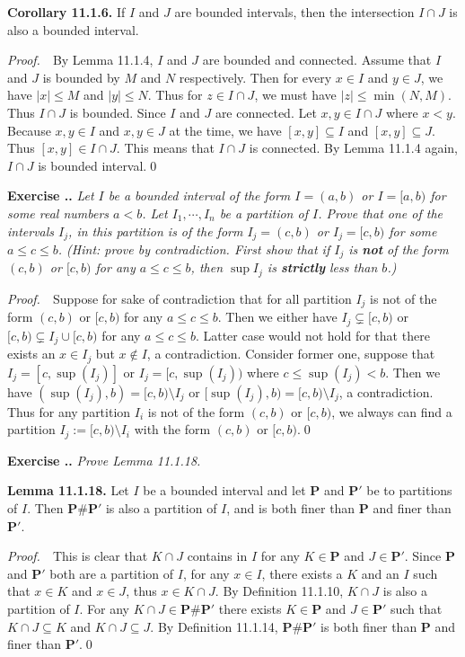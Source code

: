 \documentclass{book}
\newcommand{\pff}{\vspace{.25em}\noindent\emph{Proof.}~~}
\newcommand{\titl}[1]{\noindent\textbf{#1}}
\newcounter{Exercise}[section]
\renewcommand{\theExercise}{\thesection.\arabic{Exercise}.}
\newcommand{\new}{\vspace{1.5em}\noindent\textbf{{Exercise \stepcounter{Exercise}\textbf{\theExercise}}} }
\begin{document}
\begin{framed}
\titl{Corollary 11.1.6.} If $I$ and $J$ are bounded intervals, then the intersection $I\cap J$ is also a bounded interval.
\end{framed}

\pff By Lemma 11.1.4, $I$ and $J$ are bounded and connected. Assume that $I$ and $J$ is bounded by $M$ and $N$ respectively. Then for every $x\in I$ and $y\in J$, we have $|x|\leq M$ and $|y|\leq N$. Thus for $z\in I\cap J$, we must have $|z|\leq\min(N,M)$. Thus $I\cap J$ is bounded. Since $I$ and $J$ are connected. Let $x,y\in I\cap J$ where $x<y$. Because $x,y\in I$ and $x,y\in J$ at the time, we have $[x,y]\subseteq I$ and $[x,y]\subseteq J$. Thus $[x,y]\in I\cap J$. This means that $I\cap J$ is connected. By Lemma 11.1.4 again, $I\cap J$ is bounded interval.\qed

\new\emph{Let $I$ be a bounded interval of the form $I=(a,b)$ or $I=[a, b)$ for some real numbers $a<b$. Let $I_1,\cdots,I_n$ be a partition of $I$. Prove that one of the intervals $I_j$, in this partition is of the form $I_j=(c,b)$ or $I_j=[c,b)$ for some $a\leq c\leq b$. (Hint: prove by contradiction. First show that if $I_j$ is \textbf{not} of the form $(c,b)$ or $[c,b)$ for any $a\leq c\leq b$, then $\sup I_j$ is \textbf{strictly} less than $b$.)}

\pff Suppose for sake of contradiction that for all partition $I_j$ is not of the form $(c,b)$ or $[c,b)$ for any $a\leq c\leq b$. Then we either have $I_j\subsetneq[c,b)$ or $[c,b)\subsetneq I_j\cup[c,b)$ for any $a\leq c\leq b$. Latter case would not hold for that there exists an $x\in I_j$ but $x\notin I$, a contradiction. Consider former one, suppose that $I_j=[c,\sup(I_j)]$ or $I_j=[c,\sup(I_j))$ where $c\leq\sup(I_j)<b$. Then we have $(\sup(I_j),b)=[c,b)\setminus I_j$ or $[\sup(I_j),b)=[c,b)\setminus I_j$, a contradiction. Thus for any partition $I_i$ is not of the form $(c,b)$ or $[c,b)$, we always can find a partition $I_j:=[c,b)\setminus I_i$ with the form $(c,b)$ or $[c,b)$.\qed

\new\emph{Prove Lemma 11.1.18.}

\begin{framed}
\titl{Lemma 11.1.18.} Let $I$ be a bounded interval and let $\mathbf{P}$ and $\mathbf{P'}$ be to partitions of $I$. Then $\mathbf{P}\#\mathbf{P'}$ is also a partition of $I$, and is both finer than $\mathbf{P}$ and finer than $\mathbf{P'}$.
\end{framed}

\pff This is clear that $K\cap J$ contains in $I$ for any $K\in\mathbf{P}$ and $J\in\mathbf{P'}$. Since $\mathbf{P}$ and $\mathbf{P'}$ both are a partition of $I$, for any $x\in I$, there exists a $K$ and an $I$ such that $x\in K$ and $x\in J$, thus $x\in K\cap J$. By Definition 11.1.10, $K\cap J$ is also a partition of $I$. For any $K\cap J\in\mathbf{P}\#\mathbf{P'}$ there exists $K\in\mathbf{P}$ and $J\in\mathbf{P'}$ such that $K\cap J\subseteq K$ and $K\cap J\subseteq J$. By Definition 11.1.14, $\mathbf{P}\#\mathbf{P'}$ is both finer than $\mathbf{P}$ and finer than $\mathbf{P'}$.\qed
\end{document}
